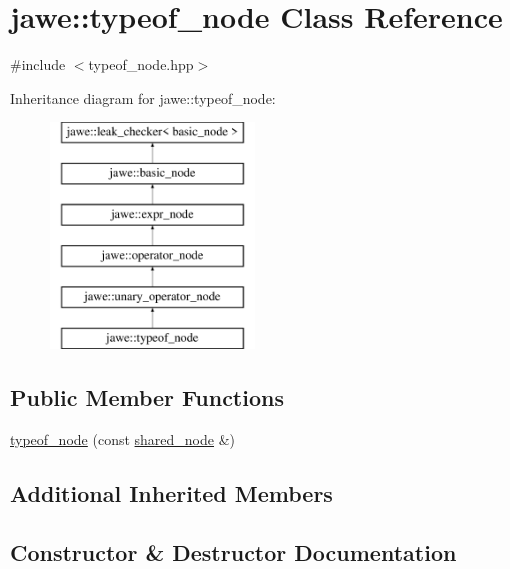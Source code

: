 \hypertarget{classjawe_1_1typeof__node}{}\section{jawe\+:\+:typeof\+\_\+node Class Reference}
\label{classjawe_1_1typeof__node}


{\ttfamily \#include $<$typeof\+\_\+node.\+hpp$>$}

Inheritance diagram for jawe\+:\+:typeof\+\_\+node\+:\begin{figure}[H]
\begin{center}
\leavevmode
\includegraphics[height=6.000000cm]{classjawe_1_1typeof__node}
\end{center}
\end{figure}
\subsection*{Public Member Functions}
\begin{DoxyCompactItemize}
\item 
\hyperlink{classjawe_1_1typeof__node_aec7f41479f1267ff392145bddaa5bc63}{typeof\+\_\+node} (const \hyperlink{namespacejawe_a3f307481d921b6cbb50cc8511fc2b544}{shared\+\_\+node} \&)
\end{DoxyCompactItemize}
\subsection*{Additional Inherited Members}


\subsection{Constructor \& Destructor Documentation}
\mbox{\label{classjawe_1_1typeof__node_aec7f41479f1267ff392145bddaa5bc63}} 
